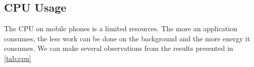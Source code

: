 \documentclass{kththesis}
\begin{document}



\subsection{CPU Usage}

The CPU on mobile phones is a limited resources. The more an application consumes, the less work can be done on the background and the more energy it consumes. We can make several observations from the results presented in \autoref{tab:cpu}  
\end{document}
